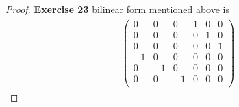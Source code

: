 \documentclass[11pt]{article}
\theoremstyle{definition}
\begin{document}
\begin{proof}{\textbf{Exercise 23}}
    bilinear form mentioned above is 
    \begin{align*}
        \begin{pmatrix}
            0  &  0  &  0  &  1  &  0  &  0 \\
            0  &  0  &  0  &  0  &  1  &  0 \\
            0  &  0  &  0  &  0  &  0  &  1 \\
           -1  &  0  &  0  &  0  &  0  &  0 \\
            0  & -1  &  0  &  0  &  0  &  0 \\
            0  &  0  & -1  &  0  &  0  &  0 \\
        \end{pmatrix}
    \end{align*}
\end{proof}
\cleardoublepage
\end{document}
